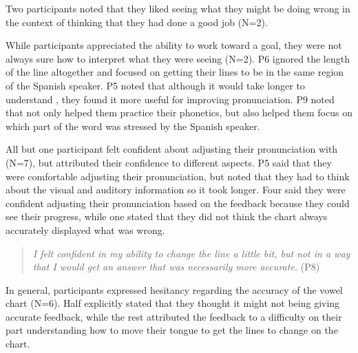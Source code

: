 Two participants noted that they liked seeing what they might be doing wrong in the context of thinking that they had done a good job (N=2).

While participants appreciated the ability to work toward a goal, they were not always sure how to interpret what they were seeing (N=2). P6 ignored the length of the line altogether and focused on getting their lines to be in the same region of the Spanish speaker. P5 noted that although it would take longer to understand \visowel{}, they found it more useful for improving pronunciation. P9 noted that \visowel{} not only helped them practice their phonetics, but also helped them focus on which part of the word was stressed by the Spanish speaker. 

All but one participant felt confident about adjusting their pronunciation with \visowel{} (N=7), but attributed their confidence to different aspects. P5 said that they were comfortable adjusting their pronunciation, but noted that they had to think about the visual and auditory information so it took longer. Four said they were confident adjusting their pronunciation based on the feedback because they could see their progress, while one stated that they did not think the chart always accurately displayed what was wrong.  
\begin{quote}
    \textit{I felt confident in my ability to change the line a little bit, but not in a way that I would get an answer that was necessarily more accurate.} (P8)
\end{quote}

In general, participants expressed hesitancy regarding the accuracy of the vowel chart (N=6). Half explicitly stated that they thought it might not being giving accurate feedback, while the rest attributed the feedback to a difficulty on their part understanding how to move their tongue to get the lines to change on the chart.  




